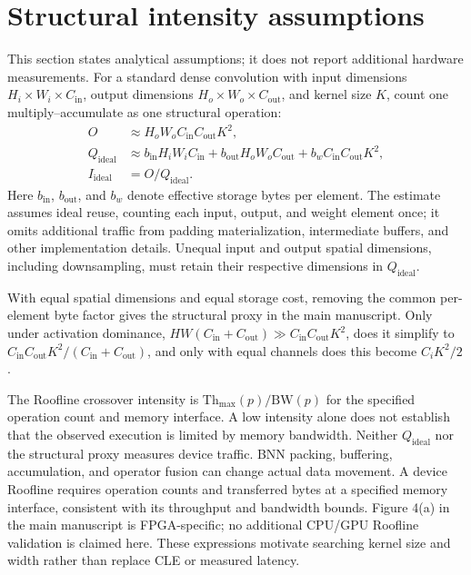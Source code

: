 \documentclass[preprint,review,12p,times]{elsarticle}
\begin{document}
\section{Structural intensity assumptions}
\label{sec:structural_intensity}
This section states analytical assumptions; it does not report additional hardware measurements. For a standard dense convolution with input dimensions $H_i\times W_i\times C_{\mathrm{in}}$, output dimensions $H_o\times W_o\times C_{\mathrm{out}}$, and kernel size $K$, count one multiply--accumulate as one structural operation:
\begin{align}
O &\approx H_oW_oC_{\mathrm{in}}C_{\mathrm{out}}K^2,\\
Q_{\mathrm{ideal}} &\approx b_{\mathrm{in}}H_iW_iC_{\mathrm{in}}
 + b_{\mathrm{out}}H_oW_oC_{\mathrm{out}}
 + b_w C_{\mathrm{in}}C_{\mathrm{out}}K^2,\\
I_{\mathrm{ideal}} &= O/Q_{\mathrm{ideal}}.
\end{align}
Here $b_{\mathrm{in}}$, $b_{\mathrm{out}}$, and $b_w$ denote effective storage bytes per element. The estimate assumes ideal reuse, counting each input, output, and weight element once; it omits additional traffic from padding materialization, intermediate buffers, and other implementation details. Unequal input and output spatial dimensions, including downsampling, must retain their respective dimensions in $Q_{\mathrm{ideal}}$.

With equal spatial dimensions and equal storage cost, removing the common per-element byte factor gives the structural proxy in the main manuscript. Only under activation dominance, $HW(C_{\mathrm{in}}+C_{\mathrm{out}})\gg C_{\mathrm{in}}C_{\mathrm{out}}K^2$, does it simplify to $C_{\mathrm{in}}C_{\mathrm{out}}K^2/(C_{\mathrm{in}}+C_{\mathrm{out}})$, and only with equal channels does this become $C_iK^2/2$.

The Roofline crossover intensity is $\mathrm{Th}_{\max}(p)/\mathrm{BW}(p)$ for the specified operation count and memory interface. A low intensity alone does not establish that the observed execution is limited by memory bandwidth. Neither $Q_{\mathrm{ideal}}$ nor the structural proxy measures device traffic. BNN packing, buffering, accumulation, and operator fusion can change actual data movement. A device Roofline requires operation counts and transferred bytes at a specified memory interface, consistent with its throughput and bandwidth bounds. Figure 4(a) in the main manuscript is FPGA-specific; no additional CPU/GPU Roofline validation is claimed here. These expressions motivate searching kernel size and width rather than replace CLE or measured latency.
\end{document}
